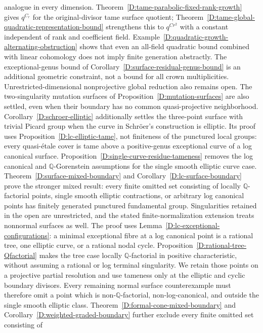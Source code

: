 \begin{remark}
analogue in every dimension. Theorem~\ref{D:tame-parabolic-fixed-rank-growth}
gives $q^{C_r}$ for the original-divisor tame surface quotient;
Theorem~\ref{D:tame-global-quadratic-representation-bound} strengthens
this to $q^{Cr^2}$ with a constant independent of rank and coefficient field.
Example~\ref{D:quadratic-growth-alternating-obstruction} shows that
even an all-field quadratic bound combined with linear cohomology
does not imply finite generation abstractly. The exceptional-genus
bound of Corollary~\ref{D:surface-residual-genus-bound} is an
additional geometric constraint, not a bound for all crown
multiplicities. Unrestricted-dimensional nonprojective global
reduction also remains open. The
two-singularity mutation surfaces of
Proposition~\ref{D:mutation-surfaces} are also settled, even when
their boundary has no common quasi-projective neighborhood.
Corollary~\ref{D:schroer-elliptic} additionally settles the
three-point surface with trivial Picard group when the curve in
Schr\"oer's construction is elliptic.  Its proof uses
Proposition~\ref{D:lc-elliptic-tame}, not finiteness of the
punctured local groups: every quasi-\'etale cover is tame above a
positive-genus exceptional curve of a log canonical surface.
Proposition~\ref{D:single-curve-residue-tameness} removes the
log canonical and $\mathbb Q$-Gorenstein assumptions for the
single smooth elliptic curve case.  Theorem~\ref{D:surface-mixed-boundary}
and Corollary~\ref{D:lc-surface-boundary} prove the stronger mixed
result: every finite omitted set consisting of locally
$\mathbb Q$-factorial points, single smooth elliptic contractions,
or arbitrary log canonical points has finitely generated punctured
fundamental group.  Singularities retained in the open are
unrestricted, and the stated finite-normalization extension
treats nonnormal surfaces as well.
The proof uses Lemma~\ref{D:lc-exceptional-configurations}:
a minimal exceptional fibre at a log canonical point is a rational
tree, one elliptic curve, or a rational nodal cycle.
Proposition~\ref{D:rational-tree-Qfactorial} makes the tree case
locally $\mathbb Q$-factorial in positive characteristic, without
assuming a rational or log terminal singularity.  We retain those
points on a projective partial resolution and use tameness only
at the elliptic and cyclic boundary divisors.  Every remaining
normal surface counterexample must therefore omit a point which
is non-$\mathbb Q$-factorial, non-log-canonical, and outside the
single smooth elliptic class.  Theorem~\ref{D:formal-cone-mixed-boundary}
and Corollary~\ref{D:weighted-graded-boundary}
further exclude every finite omitted set consisting of

\end{remark}

